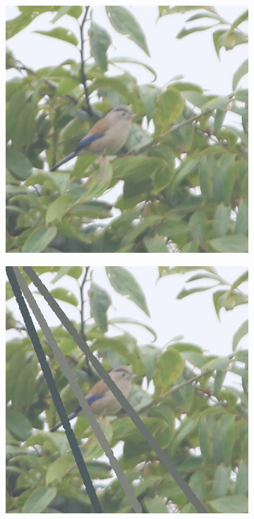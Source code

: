 \begin{figure}[H]
    \vspace{0.5em} %
    \begin{subfigure}{0.20\textwidth}
        \includegraphics[width=\linewidth]{AugSampleImages/2.png}
    \end{subfigure}
    \begin{subfigure}{0.20\textwidth}
        \includegraphics[width=\linewidth]{AugSampleImages/2X.png}
    \end{subfigure}


\end{figure}
